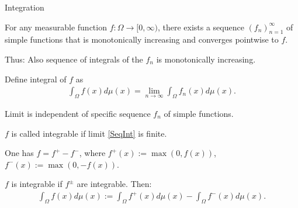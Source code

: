 \begin{frame}{Integration}

\bit
\item<1-> For any measurable function $f:\Omega\to[0,\infty)$, there exists a sequence $(f_n)_{n=1}^\infty$ of
simple functions that is monotonically increasing and converges pointwise to $f$. 
\item<2-> Thus: Also sequence of integrals of the $f_n$ is monotonically increasing.
\item<3->[\iarrow] Define integral of $f$ as
\begin{align}\label{SeqInt}
\int_\Omega f(x)d\mu(x)=\lim_{n\to\infty}\int_{\Omega}f_n(x)d\mu(x). 
\end{align}
\item<4-> Limit is independent of specific sequence $f_n$ of simple functions.
\item<5-> $f$ is called integrable if limit \eqref{SeqInt} is finite.
\eit

\bit 
\item<6-> One has $f=f^{+}-f^{-}$, where  $f^+(x):=\max(0,f(x))$, $f^{-}(x):=\max(0,-f(x))$.
\item<7-> $f$ is integrable if $f^{\pm}$ are integrable. Then:
\begin{align*}
\int_{\Omega}f(x)d\mu(x):=\int_{\Omega}f^{+}(x)d\mu(x)-\int_{\Omega}f^{-}(x)d\mu(x).
\end{align*}
\eit

\end{frame}

